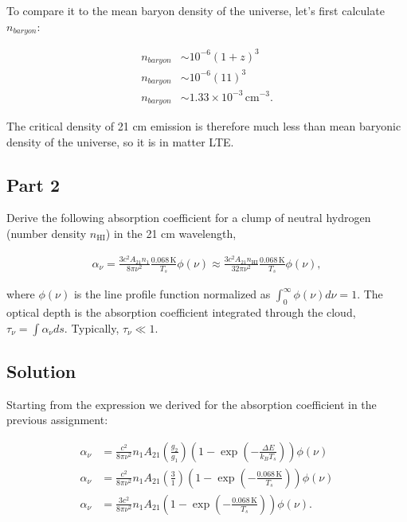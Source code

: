 \documentclass[12pt]{article}
\begin{document}
To compare it to the mean baryon density of the universe, let's first calculate $n_{baryon}$:

\begin{equation*}
\begin{split}
n_{baryon} &\sim 10^{-6}(1+z)^3\\
n_{baryon} &\sim 10^{-6}(11)^3\\
n_{baryon} &\sim 1.33\times10^{-3}\,\mathrm{cm^{-3}}.
\end{split}
\end{equation*}

The critical density of 21 cm emission is therefore much less than mean baryonic density of the universe, so it is in matter LTE.


\subsection*{Part 2}

Derive the following absorption coefficient for a clump of neutral hydrogen (number density $n_\mathrm{HI}$) in the 21 cm wavelength,

\begin{align*}
\alpha_\nu = \frac{3c^2A_{21}n_1}{8\pi\nu^2}\frac{0.068\,\mathrm{K}}{T_s}\phi(\nu) \approx \frac{3c^2A_{21}n_\mathrm{HI}}{32\pi\nu^2}\frac{0.068\,\mathrm{K}}{T_s}\phi(\nu),
\end{align*}

where $\phi(\nu)$ is the line profile function normalized as $\int_0^{\infty}\phi(\nu)d\nu=1$. The optical depth is the absorption coefficient integrated through the cloud, $\tau_\nu=\int\alpha_\nu ds$. Typically, $\tau_\nu\ll1$.



\subsection*{Solution}

Starting from the expression we derived for the absorption coefficient in the previous assignment:

\begin{equation*}
\begin{split}
\alpha_\nu &= \frac{c^2}{8\pi\nu^2}n_1A_{21}\left(\frac{g_2}{g_1}\right)\left(1-\exp\left(-\frac{\Delta E}{k_BT_s}\right)\right)\phi(\nu)\\
\alpha_\nu &= \frac{c^2}{8\pi\nu^2}n_1A_{21}\left(\frac{3}{1}\right)\left(1-\exp\left(-\frac{0.068\,\mathrm{K}}{T_s}\right)\right)\phi(\nu)\\
\alpha_\nu &= \frac{3c^2}{8\pi\nu^2}n_1A_{21}\left(1-\exp\left(-\frac{0.068\,\mathrm{K}}{T_s}\right)\right)\phi(\nu).
\end{split}
\end{equation*}
\end{document}

